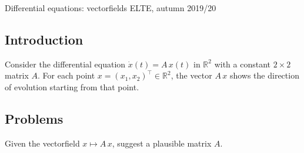 \documentclass[12pt,a4paper]{article}
\newcommand{\IR}{\mathbb{R}}
\begin{document}
    
    Differential equations: vectorfields
    \hfill
    ELTE, autumn 2019/20
    
    
    \subsection*{Introduction}
    
    Consider the differential equation
    $\dot{x}(t) = A \, x(t)$ in $\IR^2$
    with a constant $2 \times 2$ matrix $A$.
    For each point $x = (x_1, x_2)^\top \in \IR^2$,
    the vector $A \, x$ shows the direction of evolution
    starting from that point.
    
    \subsection*{Problems}
    
    Given the vectorfield $x \mapsto A \, x$,
    suggest a plausible matrix $A$.
    
\end{document}
